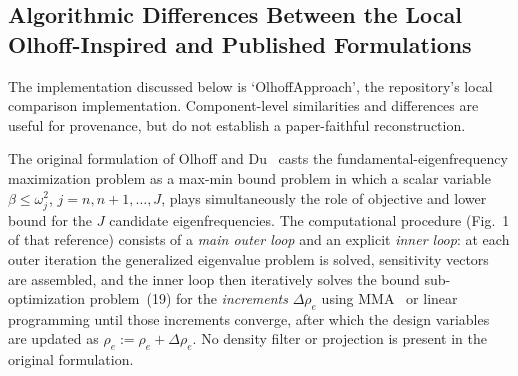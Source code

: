 %

\subsection*{Algorithmic Differences Between the Local Olhoff-Inspired and Published Formulations}

The implementation discussed below is `OlhoffApproach', the repository's local
comparison implementation. Component-level similarities and differences are
useful for provenance, but do not establish a paper-faithful reconstruction.

The original formulation of Olhoff and Du~\cite{OlhoffDu2014} casts the
fundamental-eigenfrequency maximization problem as a max-min bound problem in
which a scalar variable $\beta \leq \omega_j^2$, $j = n, n{+}1, \ldots, J$, plays
simultaneously the role of objective and lower bound for the $J$ candidate
eigenfrequencies.  The computational procedure (Fig.~1 of that reference) consists
of a \emph{main outer loop} and an explicit \emph{inner loop}: at each outer
iteration the generalized eigenvalue problem is solved, sensitivity vectors are
assembled, and the inner loop then iteratively solves the bound sub-optimization
problem~(19) for the \emph{increments} $\Delta\rho_e$ using MMA~\cite{Svanberg1987}
or linear programming until those increments converge, after which the design
variables are updated as $\rho_e \mathrel{:=} \rho_e + \Delta\rho_e$.  No density
filter or projection is present in the original formulation.

